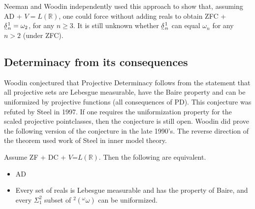 \documentclass{book}%
\newcommand{\breals}{{^{\omega}}\omega}
\def\underTilde#1{{\baselineskip=0pt\vtop{\hbox{$#1$}\hbox{$\sim$}}}{}}
\def\undertilde#1{{\baselineskip=0pt\vtop
  {\hbox{$#1$}\hbox{$\scriptscriptstyle\sim$}}}{}}
\newcommand{\uTDelta}{\underTilde{\Delta}}
\begin{document}
Neeman and Woodin independently used
this approach to show that, assuming AD + $V = L(\mathbb{R})$, one
could force without adding reals to obtain ZFC +
$\undertilde{\delta}^{1}_{n} = \omega_{2}$, for any $n \geq 3$.
It is still unknown whether $\undertilde{\delta}^{1}_{n}$ can equal
$\omega_{n}$ for any $n > 2$ (under ZFC).



\subsection{Determinacy from its consequences}

Woodin  conjectured that Projective Determinacy follows from the
statement that all projective sets are Lebesgue measurable, have the Baire property and can be uniformized by
projective functions (all consequences of PD). This conjecture was refuted by Steel in 1997. If
one requires the uniformization property for the scaled projective
pointclasses, then the conjecture is still
open. Woodin did prove the following version of the conjecture in the late 1990's.
The reverse direction of the
theorem used work of Steel in inner model theory.


\begin{theorem} Assume {\rm ZF + DC + }$V\mathord{=}L(\mathbb{R})$. Then
the following are equivalent.
\begin{itemize}
\item {\rm AD}
\item Every set of reals is Lebesgue measurable and has the property
of Baire, and every $\Sigma^{2}_{1}$ subset of\/
${^{2}(^{\omega}\omega)}$ can be uniformized.
\end{itemize}
\end{theorem}

\end{document}
